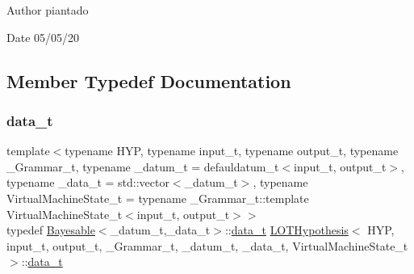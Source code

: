 \begin{DoxyAuthor}{Author}
piantado 
\end{DoxyAuthor}
\begin{DoxyDate}{Date}
05/05/20 
\end{DoxyDate}


\subsection{Member Typedef Documentation}
\mbox{\label{class_l_o_t_hypothesis_abd9c848100dfaaf2870f5dfa9ea91c65}} 
\subsubsection{\texorpdfstring{data\+\_\+t}{data\_t}}
{\footnotesize\ttfamily template$<$typename H\+YP, typename input\+\_\+t, typename output\+\_\+t, typename \+\_\+\+Grammar\+\_\+t, typename \+\_\+datum\+\_\+t = defauldatum\+\_\+t$<$input\+\_\+t, output\+\_\+t$>$, typename \+\_\+data\+\_\+t = std\+::vector$<$\+\_\+datum\+\_\+t$>$, typename Virtual\+Machine\+State\+\_\+t = typename \+\_\+\+Grammar\+\_\+t\+::template Virtual\+Machine\+State\+\_\+t$<$input\+\_\+t, output\+\_\+t$>$$>$ \\
typedef \hyperlink{class_bayesable}{Bayesable}$<$\+\_\+datum\+\_\+t,\+\_\+data\+\_\+t$>$\+::\hyperlink{class_l_o_t_hypothesis_abd9c848100dfaaf2870f5dfa9ea91c65}{data\+\_\+t} \hyperlink{class_l_o_t_hypothesis}{L\+O\+T\+Hypothesis}$<$ H\+YP, input\+\_\+t, output\+\_\+t, \+\_\+\+Grammar\+\_\+t, \+\_\+datum\+\_\+t, \+\_\+data\+\_\+t, Virtual\+Machine\+State\+\_\+t $>$\+::\hyperlink{class_l_o_t_hypothesis_abd9c848100dfaaf2870f5dfa9ea91c65}{data\+\_\+t}}

\mbox{\label{class_l_o_t_hypothesis_ae36b1f113f45ee5ac82660028672739b}} 
